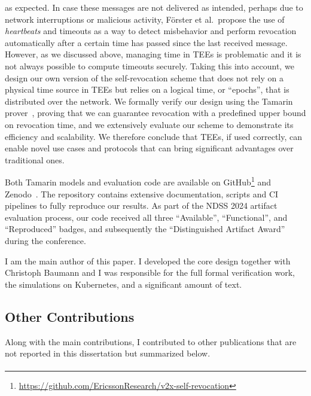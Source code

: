 as expected. In case these messages are not delivered as intended, perhaps due
to network interruptions or malicious activity, F\"orster et al.\ propose the
use of \emph{heartbeats} and timeouts as a way to detect misbehavior and perform
revocation automatically after a certain time has passed since the last received
message. However, as we discussed above, managing time in \acp{TEE} is
problematic and it is not always possible to compute timeouts securely. Taking
this into account, we design our own version of the self-revocation scheme that
does not rely on a physical time source in \acp{TEE} but relies on a logical
time, or ``epochs'', that is distributed over the network. We formally verify
our design using the Tamarin prover~\cite{meier2013tamarin}, proving that we can
guarantee revocation with a predefined upper bound on revocation time, and we
extensively evaluate our scheme to demonstrate its efficiency and scalability.
We therefore conclude that \acp{TEE}, if used correctly, can enable novel use
cases and protocols that can bring significant advantages over traditional ones.

Both Tamarin models and evaluation code are available on
GitHub\footnote{\url{https://github.com/EricssonResearch/v2x-self-revocation}}
and Zenodo~\cite{supplMaterial}. The repository contains extensive
documentation, scripts and \ac{CI} pipelines to fully reproduce our results. As
part of the NDSS 2024 artifact evaluation process, our code received all three
``Available'', ``Functional'', and ``Reproduced'' badges, and subsequently the
``Distinguished Artifact Award'' during the conference.

I am the main author of this paper. I developed the core design together with
Christoph Baumann and I was responsible for the full formal verification work,
the simulations on Kubernetes, and a significant amount of text.

\begin{formal}
    \papervtoxrefr{}
\end{formal}

\subsection{Other Contributions}
\label{thesis:intro-contributions}

Along with the main contributions, I contributed to other publications that are
not reported in this dissertation but summarized below.

\paragraph{\papersupplytitle}

